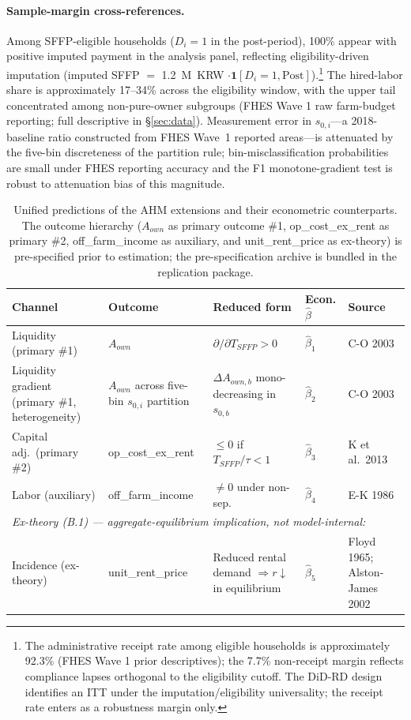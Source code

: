 \documentclass[12pt, a4paper]{article}
\begin{document}
\paragraph{Sample-margin cross-references.} Among SFFP-eligible households ($D_i = 1$ in the post-period), 100\% appear with positive imputed payment in the analysis panel, reflecting eligibility-driven imputation (imputed SFFP $=$ 1.2~M~KRW $\cdot \mathbf{1}[D_i = 1, \text{Post}]$).\footnote{The administrative receipt rate among eligible households is approximately 92.3\% (FHES Wave 1 prior descriptives); the 7.7\% non-receipt margin reflects compliance lapses orthogonal to the eligibility cutoff. The DiD-RD design identifies an ITT under the imputation/eligibility universality; the receipt rate enters as a robustness margin only.} The hired-labor share is approximately 17--34\% across the eligibility window, with the upper tail concentrated among non-pure-owner subgroups (FHES Wave 1 raw farm-budget reporting; full descriptive in \S\ref{sec:data}). Measurement error in $s_{0,i}$---a 2018-baseline ratio constructed from FHES Wave~1 reported areas---is attenuated by the five-bin discreteness of the partition rule; bin-misclassification probabilities are small under FHES reporting accuracy and the F1 monotone-gradient test is robust to attenuation bias of this magnitude.

\begin{table}[ht]
\centering
\caption{Unified predictions of the AHM extensions and their econometric counterparts. The outcome hierarchy ($A_{own}$ as primary outcome \#1, op\_cost\_ex\_rent as primary \#2, off\_farm\_income as auxiliary, and unit\_rent\_price as ex-theory) is pre-specified prior to estimation; the pre-specification archive is bundled in the replication package.}
\label{tab:alpha3-predictions}
\small
\begin{tabular}{p{2.4cm} p{3.0cm} p{3.4cm} p{1.4cm} p{2.4cm}}
\toprule
Channel & Outcome & Reduced form & Econ. $\hat\beta$ & Source \\
\midrule
Liquidity (primary \#1) & $A_{own}$ & $\partial/\partial T_{SFFP} > 0$ & $\hat\beta_1$ & C-O 2003 \\
Liquidity gradient (primary \#1, heterogeneity) & $A_{own}$ across five-bin $s_{0,i}$ partition & $\Delta A_{own,b}$ mono-decreasing in $s_{0,b}$ & $\hat\beta_2$ & C-O 2003 \\
Capital adj.\ (primary \#2) & op\_cost\_ex\_rent & $\le 0$ if $T_{SFFP}/\tau < 1$ & $\hat\beta_3$ & K et al.\ 2013 \\
Labor (auxiliary) & off\_farm\_income & $\ne 0$ under non-sep. & $\hat\beta_4$ & E-K 1986 \\
\midrule
\multicolumn{5}{l}{\textit{Ex-theory (B.1) --- aggregate-equilibrium implication, not model-internal:}} \\
Incidence (ex-theory) & unit\_rent\_price & Reduced rental demand $\Rightarrow r \downarrow$ in equilibrium & $\hat\beta_5$ & Floyd 1965; Alston-James 2002 \\
\bottomrule
\end{tabular}
\end{table}
\end{document}
